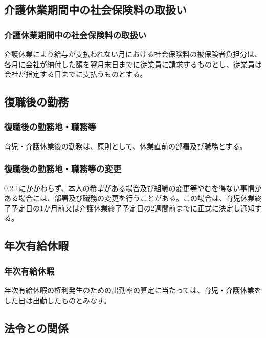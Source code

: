 \documentclass{jsarticle}
\begin{document}
\subsection{介護休業期間中の社会保険料の取扱い}
\label{育介_条_介護休業期間中の社会保険料の取扱い}

\subsubsection{介護休業期間中の社会保険料の取扱い}
\label{育介_項_介護休業期間中の社会保険料の取扱い}
介護休業により給与が支払われない月における社会保険料の被保険者負担分は、各月に会社が納付した額を翌月末日までに従業員に請求するものとし、従業員は会社が指定する日までに支払うものとする。

\subsection{復職後の勤務}
\label{育介_条_復職後の勤務}

\subsubsection{復職後の勤務地・職務等}
\label{育介_項_復職後の勤務地・職務等}
育児・介護休業後の勤務は、原則として、休業直前の部署及び職務とする。

\subsubsection{復職後の勤務地・職務等の変更}
\label{育介_項_復職後の勤務地・職務等の変更}
\ref{育介_項_復職後の勤務地・職務等}にかかわらず、本人の希望がある場合及び組織の変更等やむを得ない事情がある場合には、部署及び職務の変更を行うことがある。この場合は、育児休業終了予定日の1か月前又は介護休業終了予定日の2週間前までに正式に決定し通知する。

\subsection{年次有給休暇}
\label{育介_条_年次有給休暇}

\subsubsection{年次有給休暇}
\label{育介_項_年次有給休暇}
年次有給休暇の権利発生のための出勤率の算定に当たっては、育児・介護休業をした日は出勤したものとみなす。

\subsection{法令との関係}
\label{育介_条_法令との関係}
\end{document}
